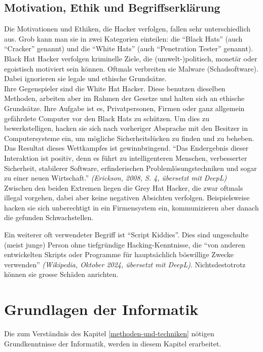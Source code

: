 \documentclass[11pt, a4paper]{article}
\begin{document}
\subsection{Motivation, Ethik und Begriffserklärung}
Die Motivationen und Ethiken, die Hacker verfolgen, fallen sehr unterschiedlich aus. Grob kann man sie in zwei Kategorien einteilen: die ``Black Hats'' (auch ``Cracker'' genannt) und die ``White Hats'' (auch ``Penetration Tester'' genannt). \\Black Hat Hacker verfolgen kriminelle Ziele, die (umwelt-)politisch, monetär oder egoistisch motiviert sein können. Oftmals verbreiten sie Malware (Schadsoftware). Dabei ignorieren sie legale und ethische Grundsätze. \\Ihre Gegenspieler sind die White Hat Hacker. Diese benutzen dieselben Methoden, arbeiten aber im Rahmen der Gesetze und halten sich an ethische Grundsätze. Ihre Aufgabe ist es, Privatpersonen, Firmen oder ganz allgemein gefährdete Computer vor den Black Hats zu schützen. Um dies zu bewerkstelligen, hacken sie sich nach vorheriger Absprache mit den Besitzer in Computersysteme ein, um mögliche Sicherheitslücken zu finden und zu beheben. \\ Das Resultat dieses Wettkampfes ist  gewinnbringend. ``Das Endergebnis dieser Interaktion ist positiv, denn es führt zu intelligenteren Menschen, verbesserter Sicherheit, stabilerer Software, erfinderischen Problemlösungstechniken und sogar zu einer neuen Wirtschaft.'' \textit{(Erickson, 2008, S. 4, übersetzt mit DeepL)} \cite{erickson2008hacking}\\Zwischen den beiden Extremen liegen die Grey Hat Hacker, die zwar oftmals illegal vorgehen, dabei aber keine negativen Absichten verfolgen. Beispielsweise hacken sie sich unberechtigt in ein Firmensystem ein, kommunizieren aber danach die gefunden Schwachstellen. \cite{WhiteHatBlackHat:paper, BlackHat34:online}

Ein weiterer oft verwendeter Begriff ist ``Script Kiddies''. Dies sind ungeschulte (meist junge) Person ohne tiefgründige Hacking-Kenntnisse, die ``von anderen entwickelten Skripts oder Programme für hauptsächlich böswillige Zwecke verwenden'' \textit{(Wikipedia, Oktober 2024, übersetzt mit DeepL)}. Nichtsdestotrotz können sie grosse Schäden anrichten. \cite{ScriptkiWikipedia:online}

\newpage
\section{Grundlagen der Informatik}
Die zum Verständnis des Kapitel \ref{methoden-und-techniken}  nötigen Grundkenntnisse der Informatik, werden in diesem Kapitel erarbeitet. 
\end{document}
